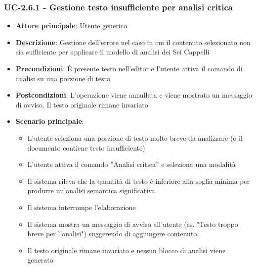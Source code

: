 \documentclass[11pt,a4paper]{article}
\begin{document}
\subsubsection{UC-2.6.1 - Gestione testo insufficiente per analisi critica}
\begin{itemize}
    \item \textbf{Attore principale}: Utente generico
    \item \textbf{Descrizione}: Gestione dell’errore nel caso in cui il contenuto selezionato non sia sufficiente per applicare il modello di analisi dei Sei Cappelli
    \item \textbf{Precondizioni}: È presente testo nell’editor e l’utente attiva il comando di analisi su una porzione di testo
    \item \textbf{Postcondizioni}: L’operazione viene annullata e viene mostrato un messaggio di avviso. Il testo originale rimane invariato
    \item \textbf{Scenario principale}:
    \begin{itemize}
        \item L’utente seleziona una porzione di testo molto breve da analizzare (o il documento contiene testo insufficiente)
        \item L’utente attiva il comando ”Analisi critica” e seleziona una modalità
        \item Il sistema rileva che la quantità di testo è inferiore alla soglia minima per produrre un'analisi semantica significativa
        \item Il sistema interrompe l'elaborazione
        \item Il sistema mostra un messaggio di avviso all'utente (es. "Testo troppo breve per l'analisi") suggerendo di aggiungere contenuto.
        \item Il testo originale rimane invariato e nessun blocco di analisi viene generato
    \end{itemize}
\end{itemize}
\end{document}
